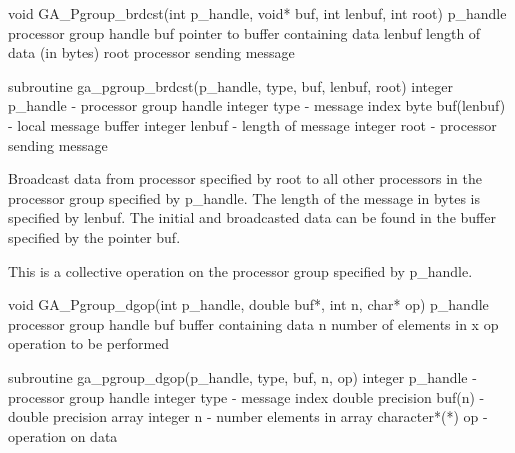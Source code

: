 \documentclass[12pt]{article}
\begin{document}

\begin{capi}
void GA_Pgroup_brdcst(int p_handle, void* buf, int lenbuf, int root)
   p_handle                  processor group handle             \access{[input]} 
   buf                       pointer to buffer containing data   
   lenbuf                    length of data (in bytes)          \access{[input]} 
   root                      processor sending message          \access{[input]} 
\end{capi}
\begin{fapi}
subroutine ga_pgroup_brdcst(p_handle, type, buf, lenbuf, root)
   integer p_handle          - processor group handle      \access{[input]} 
   integer type              - message index               \access{[input]} 
   byte buf(lenbuf)          - local message buffer         
   integer lenbuf            - length of message           \access{[input]} 
   integer root              - processor sending message   \access{[input]} 
\end{fapi}

\begin{desc}

Broadcast data from processor specified by root to all other processors in the processor group specified by p_handle. The length of the message in bytes is specified by lenbuf. The initial and broadcasted data can be found in the buffer specified by the pointer buf.

This is a collective operation on the processor group specified by p_handle. 
\end{desc}


\begin{capi}
void GA_Pgroup_dgop(int p_handle, double buf*, int n, char* op)
   p_handle                  processor group handle            \access{[input]} 
   buf                       buffer containing data             
   n                         number of elements in x           \access{[input]} 
   op                        operation to be performed         \access{[input]} 
\end{capi}
\begin{fapi}
subroutine ga_pgroup_dgop(p_handle, type, buf, n, op)
   integer p_handle          - processor group handle      \access{[input]} 
   integer type              - message index               \access{[input]} 
   double precision buf(n)   - double precision array       
   integer n                 - number elements in array    \access{[input]} 
   character*(*) op          - operation on data           \access{[input]} 
\end{fapi}
\end{document}
